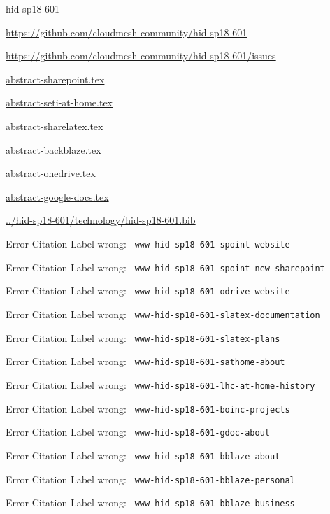 \begin{IU}

hid-sp18-601

\url{https://github.com/cloudmesh-community/hid-sp18-601}

\url{https://github.com/cloudmesh-community/hid-sp18-601/issues}

\href{https://github.com/cloudmesh-community/hid-sp18-601/blob/master//technology/abstract-sharepoint.tex}{abstract-sharepoint.tex}

\href{https://github.com/cloudmesh-community/hid-sp18-601/blob/master//technology/abstract-seti-at-home.tex}{abstract-seti-at-home.tex}

\href{https://github.com/cloudmesh-community/hid-sp18-601/blob/master//technology/abstract-sharelatex.tex}{abstract-sharelatex.tex}

\href{https://github.com/cloudmesh-community/hid-sp18-601/blob/master//technology/abstract-backblaze.tex}{abstract-backblaze.tex}

\href{https://github.com/cloudmesh-community/hid-sp18-601/blob/master//technology/abstract-onedrive.tex}{abstract-onedrive.tex}

\href{https://github.com/cloudmesh-community/hid-sp18-601/blob/master//technology/abstract-google-docs.tex}{abstract-google-docs.tex}

\href{https://github.com/cloudmesh-community/hid-sp18-601/blob/master//technology/hid-sp18-601.bib}{../hid-sp18-601/technology/hid-sp18-601.bib}

 Error Citation Label wrong: \verb| www-hid-sp18-601-spoint-website |

 Error Citation Label wrong: \verb| www-hid-sp18-601-spoint-new-sharepoint |

 Error Citation Label wrong: \verb| www-hid-sp18-601-odrive-website |

 Error Citation Label wrong: \verb| www-hid-sp18-601-slatex-documentation |

 Error Citation Label wrong: \verb| www-hid-sp18-601-slatex-plans |

 Error Citation Label wrong: \verb| www-hid-sp18-601-sathome-about |

 Error Citation Label wrong: \verb| www-hid-sp18-601-lhc-at-home-history |

 Error Citation Label wrong: \verb| www-hid-sp18-601-boinc-projects |

 Error Citation Label wrong: \verb| www-hid-sp18-601-gdoc-about |

 Error Citation Label wrong: \verb| www-hid-sp18-601-bblaze-about |

 Error Citation Label wrong: \verb| www-hid-sp18-601-bblaze-personal |

 Error Citation Label wrong: \verb| www-hid-sp18-601-bblaze-business |

\end{IU}


